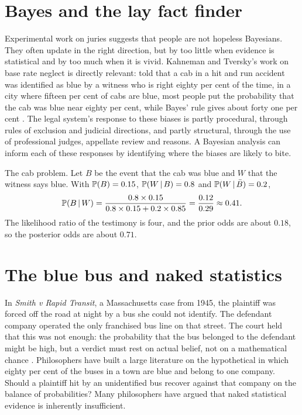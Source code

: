 \section{Bayes and the lay fact finder}

Experimental work on juries suggests that people are not hopeless Bayesians. They often update in the right direction, but by too little when evidence is statistical and by too much when it is vivid. Kahneman and Tversky's work on base rate neglect is directly relevant: told that a cab in a hit and run accident was identified as blue by a witness who is right eighty per cent of the time, in a city where fifteen per cent of cabs are blue, most people put the probability that the cab was blue near eighty per cent, while Bayes' rule gives about forty one per cent \citep{tversky1982}. The legal system's response to these biases is partly procedural, through rules of exclusion and judicial directions, and partly structural, through the use of professional judges, appellate review and reasons. A Bayesian analysis can inform each of these responses by identifying where the biases are likely to bite.

\begin{keybox}
The cab problem. Let $B$ be the event that the cab was blue and $W$ that the witness says blue. With $\mathbb{P}(B) = 0.15$, $\mathbb{P}(W\,\vert\, B) = 0.8$ and $\mathbb{P}(W\,\vert\, \bar B) = 0.2$,
\[
\mathbb{P}(B\,\vert\, W) = \frac{0.8\times 0.15}{0.8 \times 0.15 + 0.2 \times 0.85} = \frac{0.12}{0.29} \approx 0.41.
\]
The likelihood ratio of the testimony is four, and the prior odds are about $0.18$, so the posterior odds are about $0.71$.
\end{keybox}

\section{The blue bus and naked statistics}

In \emph{Smith v Rapid Transit}, a Massachusetts case from 1945, the plaintiff was forced off the road at night by a bus she could not identify. The defendant company operated the only franchised bus line on that street. The court held that this was not enough: the probability that the bus belonged to the defendant might be high, but a verdict must rest on actual belief, not on a mathematical chance \citep{smith1945}. Philosophers have built a large literature on the hypothetical in which eighty per cent of the buses in a town are blue and belong to one company. Should a plaintiff hit by an unidentified bus recover against that company on the balance of probabilities? Many philosophers have argued that naked statistical evidence is inherently insufficient.

